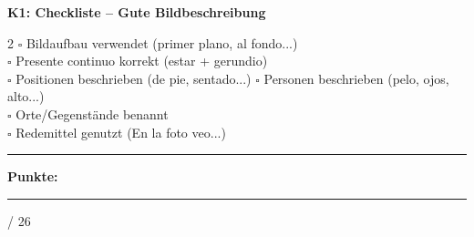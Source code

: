 \documentclass[10pt, a4paper]{article}
\newcommand{\sanstext}[1]{{\fontfamily{phv}\selectfont #1}}
\newcommand{\maxpunkte}{26}
\newcommand{\luecke}[1]{\rule{#1}{0.4pt}}
\begin{document}
\begin{checklistbox}
\sanstext{\small\textbf{K1: Checkliste – Gute Bildbeschreibung}}

\vspace{4pt}

{\small
\begin{multicols}{2}
$\square$ Bildaufbau verwendet (primer plano, al fondo...)\\
$\square$ Presente continuo korrekt (estar + gerundio)\\
$\square$ Positionen beschrieben (de pie, sentado...)
\columnbreak
$\square$ Personen beschrieben (pelo, ojos, alto...)\\
$\square$ Orte/Gegenstände benannt\\
$\square$ Redemittel genutzt (En la foto veo...)
\end{multicols}
}
\end{checklistbox}


\vfill

\noindent\rule{\textwidth}{0.5pt}

\vspace{4pt}

\hfill\sanstext{\textbf{Punkte:}} \luecke{1.2cm} / \maxpunkte
\end{document}

